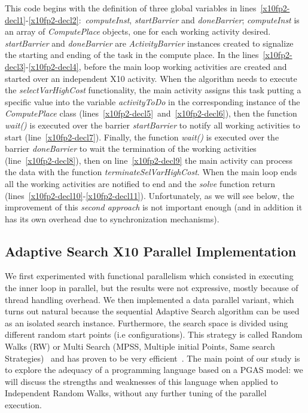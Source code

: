 \documentclass{llncs}
\begin{document}
This code begins with the definition of three global variables in
lines~\ref{x10fp2-decl1}-\ref{x10fp2-decl2}:~\emph{computeInst},
\emph{startBarrier} and \emph{doneBarrier}; \emph{computeInst} is an array of
\emph{ComputePlace} objects, one for each working activity
desired. \emph{startBarrier} and \emph{doneBarrier} are
\emph{ActivityBarrier} instances created to signalize the starting and ending
of the task in the compute place. In the
lines~\ref{x10fp2-decl3}-\ref{x10fp2-decl4}, before the main loop 
working activities are created and started over an independent X10
activity. When the algorithm needs to execute the \emph{selectVarHighCost}
functionality, the main activity assigns this task putting a specific value
into the variable \emph{activityToDo} in the corresponding instance of the
\emph{ComputePlace} class (lines~\ref{x10fp2-decl5}~and~\ref{x10fp2-decl6}),
then the function \emph{wait()} is executed over the barrier
\emph{startBarrier} to notify all working activities to start
(line~\ref{x10fp2-decl7}). Finally, the function \emph{wait()} is executed
over the barrier \emph{doneBarrier} to wait the termination of the working
activities (line~\ref{x10fp2-decl8}), then on line~\ref{x10fp2-decl9} the
main activity can process the data with the function
\emph{terminateSelVarHighCost}. When the main loop ends all the working
activities are notified to end and the \textit{solve} function return
(lines~\ref{x10fp2-decl10}-\ref{x10fp2-decl11}).  Unfortunately, as we will
see below, the improvement of this \emph{second approach} is not important
enough (and in addition it has its own overhead due to synchronization
mechanisms).
\fi{}                           

\subsection{Adaptive Search X10 Parallel Implementation}
We first experimented with functional parallelism which consisted in
executing the inner loop in parallel, but the results were not
expressive, mostly because of thread handling overhead.  We then
implemented a data parallel variant, which turns out natural because
the sequential Adaptive Search algorithm can be used as an isolated
search instance.  Furthermore, the search space is divided using
different random start points (i.e configurations).  This strategy is
called Random Walks (RW) or Multi Search (MPSS, Multiple initial
Points, Same search Strategies)~\cite{Crainic2010} and has proven to
be very efficient~\cite{Diaz2011,Machado2012}.  The main point of our
study is to explore the adequacy of a programming language based on a
PGAS model: we will discuss the strengths and weaknesses of this
language when applied to Independent Random Walks, without any further
tuning of the parallel execution.
\end{document}
